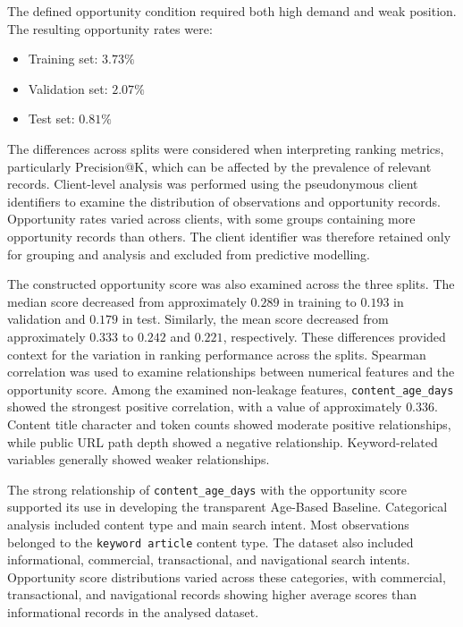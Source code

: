 \documentclass[12pt,a4paper]{report}
\begin{document}
The defined opportunity condition required both high demand and weak position. The resulting opportunity rates were:

\begin{itemize}
    \item Training set: $3.73\%$
    \item Validation set: $2.07\%$
    \item Test set: $0.81\%$
\end{itemize}

The differences across splits were considered when interpreting ranking metrics, particularly Precision@K, which can be affected by the prevalence of relevant records. Client-level analysis was performed using the pseudonymous client identifiers to examine the distribution of observations and opportunity records. Opportunity rates varied across clients, with some groups containing more opportunity records than others. The client identifier was therefore retained only for grouping and analysis and excluded from predictive modelling.

The constructed opportunity score was also examined across the three splits. The median score decreased from approximately $0.289$ in training to $0.193$ in validation and $0.179$ in test. Similarly, the mean score decreased from approximately $0.333$ to $0.242$ and $0.221$, respectively. These differences provided context for the variation in ranking performance across the splits. Spearman correlation was used to examine relationships between numerical features and the opportunity score. Among the examined non-leakage features, \texttt{content\_age\_days} showed the strongest positive correlation, with a value of approximately $0.336$. Content title character and token counts showed moderate positive relationships, while public URL path depth showed a negative relationship. Keyword-related variables generally showed weaker relationships.

The strong relationship of \texttt{content\_age\_days} with the opportunity score supported its use in developing the transparent Age-Based Baseline. Categorical analysis included content type and main search intent. Most observations belonged to the \texttt{keyword article} content type. The dataset also included informational, commercial, transactional, and navigational search intents. Opportunity score distributions varied across these categories, with commercial, transactional, and navigational records showing higher average scores than informational records in the analysed dataset.
\end{document}
